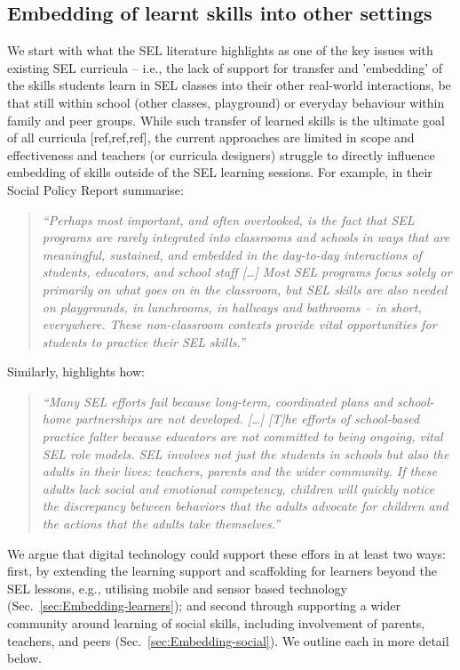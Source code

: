\documentclass[prodmode,acmtochi]{acmsmall}
\newcommand{\qqq}[1]{\begin{quotation} \emph{``#1''} \end{quotation}}
\begin{document}
\subsection{Embedding of learnt skills into other settings}
\label{sec:embedding}
We start with what the SEL literature highlights as one of the key issues with existing SEL curricula -- i.e., the lack of support for transfer and 'embedding' of the skills students learn in SEL classes into their other real-world interactions, be that still within school (other classes, playground) or everyday behaviour within family and peer groups. 
%
While such transfer of learned skills is the ultimate goal of all curricula [ref,ref,ref], the current approaches are limited in scope and effectiveness and teachers (or curricula designers) struggle to directly influence embedding of skills outside of the SEL learning sessions.
%
For example, in their Social Policy Report  summarise: \qqq{Perhaps most important, and often overlooked, is the fact that SEL programs are rarely integrated into classrooms and schools in ways that are meaningful, sustained, and embedded in the day-to-day interactions of students, educators, and school staff [\dots] Most SEL programs focus solely or primarily on what goes on in the classroom, but SEL skills are also needed on playgrounds, in lunchrooms, in hallways and bathrooms -- in short, everywhere. These non-classroom contexts provide vital opportunities for students to practice their SEL skills.}
%
Similarly,  highlights how: \qqq{Many SEL efforts fail because long-term, coordinated plans and school-home partnerships are not developed. [\dots] [T]he efforts of school-based practice falter because educators are not committed to being ongoing, vital SEL role models. SEL involves not just the students in schools but also the adults in their lives: teachers, parents and the wider community. If these adults lack social and emotional competency, children will quickly notice the discrepancy between behaviors that the adults advocate for children and the actions that the adults take themselves.}



We argue that digital technology could support these effors in at least two ways: first, by extending the learning support and scaffolding for learners beyond the SEL lessons, e.g., utilising mobile and sensor based technology (Sec.~\ref{sec:Embedding-learners}); and second through supporting a wider community around learning of social skills, including involvement of parents, teachers, and peers (Sec.~\ref{sec:Embedding-social}). We outline each in more detail below. 
\end{document}
